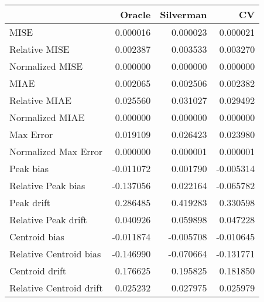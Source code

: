 \begin{tabular}{lrrr}
  \hline
 & Oracle & Silverman & CV \\ 
  \hline
MISE & 0.000016 & 0.000023 & 0.000021 \\ 
  Relative MISE & 0.002387 & 0.003533 & 0.003270 \\ 
  Normalized MISE & 0.000000 & 0.000000 & 0.000000 \\ 
  MIAE & 0.002065 & 0.002506 & 0.002382 \\ 
  Relative MIAE & 0.025560 & 0.031027 & 0.029492 \\ 
  Normalized MIAE & 0.000000 & 0.000000 & 0.000000 \\ 
  Max Error & 0.019109 & 0.026423 & 0.023980 \\ 
  Normalized Max Error & 0.000000 & 0.000001 & 0.000001 \\ 
  Peak bias & -0.011072 & 0.001790 & -0.005314 \\ 
  Relative Peak bias & -0.137056 & 0.022164 & -0.065782 \\ 
  Peak drift & 0.286485 & 0.419283 & 0.330598 \\ 
  Relative Peak drift & 0.040926 & 0.059898 & 0.047228 \\ 
  Centroid bias & -0.011874 & -0.005708 & -0.010645 \\ 
  Relative Centroid bias & -0.146990 & -0.070664 & -0.131771 \\ 
  Centroid drift & 0.176625 & 0.195825 & 0.181850 \\ 
  Relative Centroid drift & 0.025232 & 0.027975 & 0.025979 \\ 
   \hline
\end{tabular}
